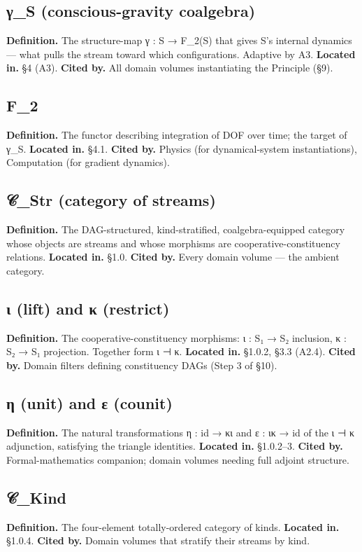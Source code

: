 \documentclass[11pt, openany]{book}
\begin{document}
\subsection{γ\_\allowbreak{}S (conscious-gravity coalgebra)}
\textbf{Definition.} The structure-map γ : S → F\_\allowbreak{}2(S) that gives S's internal dynamics --- what pulls the stream toward which configurations. Adaptive by A3.
\textbf{Located in.} §4 (A3).
\textbf{Cited by.} All domain volumes instantiating the Principle (§9).

\subsection{F\_\allowbreak{}2}
\textbf{Definition.} The functor describing integration of DOF over time; the target of γ\_\allowbreak{}S.
\textbf{Located in.} §4.1.
\textbf{Cited by.} Physics (for dynamical-system instantiations), Computation (for gradient dynamics).

\subsection{𝒞\_\allowbreak{}Str (category of streams)}
\textbf{Definition.} The DAG-structured, kind-stratified, coalgebra-equipped category whose objects are streams and whose morphisms are cooperative-constituency relations.
\textbf{Located in.} §1.0.
\textbf{Cited by.} Every domain volume --- the ambient category.

\subsection{ι (lift) and κ (restrict)}
\textbf{Definition.} The cooperative-constituency morphisms: ι : S₁ → S₂ inclusion, κ : S₂ → S₁ projection. Together form ι ⊣ κ.
\textbf{Located in.} §1.0.2, §3.3 (A2.4).
\textbf{Cited by.} Domain filters defining constituency DAGs (Step 3 of §10).

\subsection{η (unit) and ε (counit)}
\textbf{Definition.} The natural transformations η : id → κι and ε : ικ → id of the ι ⊣ κ adjunction, satisfying the triangle identities.
\textbf{Located in.} §1.0.2–3.
\textbf{Cited by.} Formal-mathematics companion; domain volumes needing full adjoint structure.

\subsection{𝒞\_\allowbreak{}Kind}
\textbf{Definition.} The four-element totally-ordered category of kinds.
\textbf{Located in.} §1.0.4.
\textbf{Cited by.} Domain volumes that stratify their streams by kind.
\end{document}
